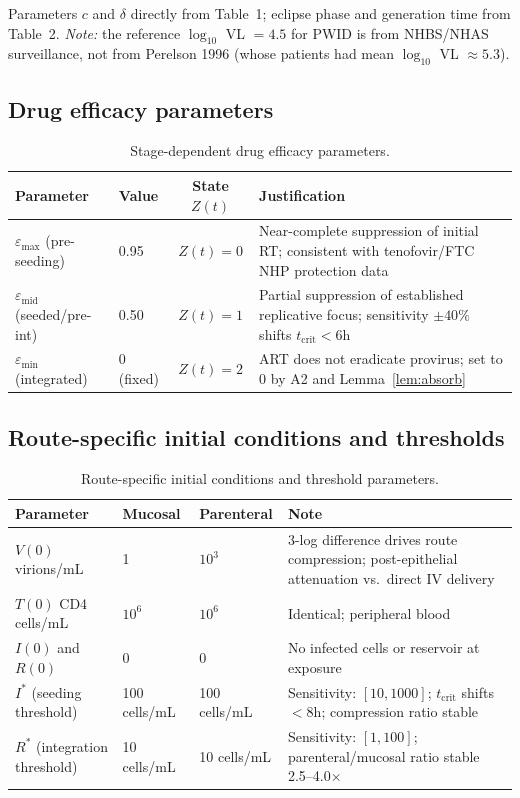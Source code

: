 \documentclass[11pt]{article}
\theoremstyle{definition}
\theoremstyle{remark}
\newcommand{\tcrit}{t_{\text{crit}}}
\newcommand{\emax}{\varepsilon_{\max}}
\newcommand{\emid}{\varepsilon_{\text{mid}}}
\newcommand{\emin}{\varepsilon_{\min}}
\begin{document}
Parameters $c$ and $\delta$ directly from Table~1; eclipse phase and generation time from Table~2. \textit{Note:} the reference $\log_{10}$ VL $= 4.5$ for PWID is from NHBS/NHAS surveillance, not from Perelson 1996 (whose patients had mean $\log_{10}$ VL $\approx 5.3$).

\subsection{Drug efficacy parameters}

\begin{table}[H]
\centering
\small
\caption{Stage-dependent drug efficacy parameters.}
\begin{tabular}{@{}llcp{6.5cm}@{}}
\toprule
\textbf{Parameter} & \textbf{Value} & \textbf{State $Z(t)$} & \textbf{Justification} \\
\midrule
$\emax$ (pre-seeding) & 0.95 & $Z(t) = 0$ & Near-complete suppression of initial RT; consistent with tenofovir/FTC NHP protection data \\
$\emid$ (seeded/pre-int) & 0.50 & $Z(t) = 1$ & Partial suppression of established replicative focus; sensitivity $\pm 40\%$ shifts $\tcrit < 6$h \\
$\emin$ (integrated) & 0 (fixed) & $Z(t) = 2$ & ART does not eradicate provirus; set to 0 by A2 and Lemma~\ref{lem:absorb} \\
\bottomrule
\end{tabular}
\end{table}

\subsection{Route-specific initial conditions and thresholds}

\begin{table}[H]
\centering
\small
\caption{Route-specific initial conditions and threshold parameters.}
\begin{tabular}{@{}lllp{6cm}@{}}
\toprule
\textbf{Parameter} & \textbf{Mucosal} & \textbf{Parenteral} & \textbf{Note} \\
\midrule
$V(0)$ virions/mL & 1 & $10^{3}$ & 3-log difference drives route compression; post-epithelial attenuation vs.\ direct IV delivery \\
$T(0)$ CD4 cells/mL & $10^{6}$ & $10^{6}$ & Identical; peripheral blood \\
$I(0)$ and $R(0)$ & 0 & 0 & No infected cells or reservoir at exposure \\
$I^{*}$ (seeding threshold) & 100 cells/mL & 100 cells/mL & Sensitivity: $[10, 1000]$; $\tcrit$ shifts $<8$h; compression ratio stable \\
$R^{*}$ (integration threshold) & 10 cells/mL & 10 cells/mL & Sensitivity: $[1, 100]$; parenteral/mucosal ratio stable 2.5--4.0$\times$ \\
\bottomrule
\end{tabular}
\end{table}
\end{document}
